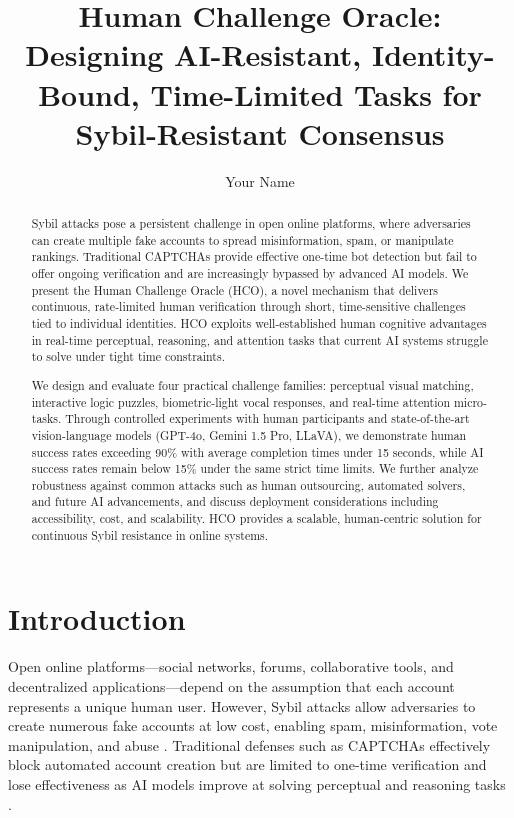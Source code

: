 \documentclass[sigconf,nonacm]{acmart}
\title{Human Challenge Oracle: Designing AI-Resistant, Identity-Bound, Time-Limited Tasks for Sybil-Resistant Consensus}
\author{Your Name}
\affiliation{%
	\institution{University of Deusto}
	\department{DeustoTech}
	\city{Bilbao}
	\country{Spain}
}
\begin{document}
	
\begin{abstract}
	Sybil attacks pose a persistent challenge in open online platforms, where adversaries can create multiple fake accounts to spread misinformation, spam, or manipulate rankings. Traditional CAPTCHAs provide effective one-time bot detection but fail to offer ongoing verification and are increasingly bypassed by advanced AI models. We present the Human Challenge Oracle (HCO), a novel mechanism that delivers continuous, rate-limited human verification through short, time-sensitive challenges tied to individual identities. HCO exploits well-established human cognitive advantages in real-time perceptual, reasoning, and attention tasks that current AI systems struggle to solve under tight time constraints.
	
	We design and evaluate four practical challenge families: perceptual visual matching, interactive logic puzzles, biometric-light vocal responses, and real-time attention micro-tasks. Through controlled experiments with human participants and state-of-the-art vision-language models (GPT-4o, Gemini 1.5 Pro, LLaVA), we demonstrate human success rates exceeding 90\% with average completion times under 15 seconds, while AI success rates remain below 15\% under the same strict time limits. We further analyze robustness against common attacks such as human outsourcing, automated solvers, and future AI advancements, and discuss deployment considerations including accessibility, cost, and scalability. HCO provides a scalable, human-centric solution for continuous Sybil resistance in online systems.
\end{abstract}
	
	\maketitle
	
	\section{Introduction}
	
	Open online platforms—social networks, forums, collaborative tools, and decentralized applications—depend on the assumption that each account represents a unique human user. However, Sybil attacks allow adversaries to create numerous fake accounts at low cost, enabling spam, misinformation, vote manipulation, and abuse \cite{douceur2002sybil}. Traditional defenses such as CAPTCHAs \cite{vonahn2003captcha} effectively block automated account creation but are limited to one-time verification and lose effectiveness as AI models improve at solving perceptual and reasoning tasks \cite{geirhos2018generalisation,brendel2019approximating}.
	
\end{document}
